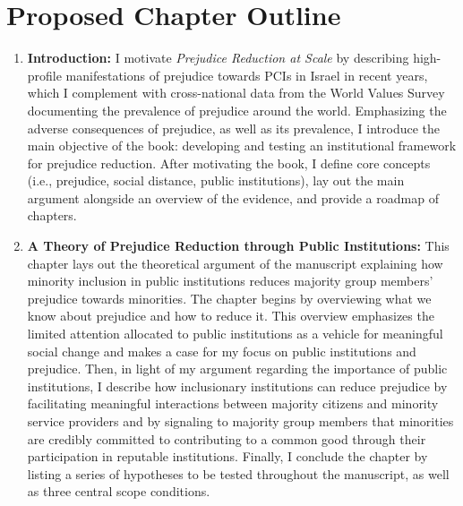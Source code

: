 \documentclass[12pt]{article}
\theoremstyle{plain}
\begin{document}
\section*{Proposed Chapter Outline}
\begin{enumerate}
\item \textbf{Introduction:} I motivate \emph{Prejudice Reduction at Scale} by describing high-profile manifestations of prejudice towards PCIs in Israel in recent years, which I complement with cross-national data from the World Values Survey documenting the prevalence of prejudice around the world. Emphasizing the adverse consequences of prejudice, as well as its prevalence, I introduce the main objective of the book: developing and testing an institutional framework for prejudice reduction. After motivating the book, I define core concepts (i.e., prejudice, social distance, public institutions), lay out the main argument alongside an overview of the evidence, and provide a roadmap of chapters.







\item \textbf{A Theory of Prejudice Reduction through Public Institutions:} This chapter lays out the theoretical argument of the manuscript explaining how minority inclusion in public institutions reduces majority group members' prejudice towards minorities. The chapter begins by overviewing what we know about prejudice and how to reduce it. This overview emphasizes the limited attention allocated to public institutions as a vehicle for meaningful social change and makes a case for my focus on public institutions and prejudice. Then, in light of my argument regarding the importance of public institutions, I describe how inclusionary institutions can reduce prejudice by facilitating meaningful interactions between majority citizens and minority service providers and by signaling to majority group members that minorities are credibly committed to contributing to a common good through their participation in reputable institutions. Finally, I conclude the chapter by listing a series of hypotheses to be tested throughout the manuscript, as well as three central scope conditions. 




\end{enumerate}
\end{document}
